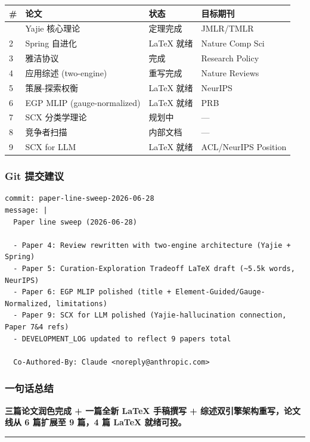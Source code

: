 \documentclass[
  12pt,
]{ctexart}
\begin{document}
\begin{longtable}[]{@{}llll@{}}
\toprule\noalign{}
\# & 论文 & 状态 & 目标期刊 \\
\midrule\noalign{}
\endhead
\bottomrule\noalign{}
\endlastfoot
1 & Yajie 核心理论 & 定理完成 & JMLR/TMLR \\
2 & Spring 自进化 & LaTeX 就绪 & Nature Comp Sci \\
3 & 雅洁协议 & 完成 & Research Policy \\
4 & 应用综述 (two-engine) & 重写完成 & Nature Reviews \\
5 & 策展-探索权衡 & LaTeX 就绪 & NeurIPS \\
6 & EGP MLIP (gauge-normalized) & LaTeX 就绪 & PRB \\
7 & SCX 分类学理论 & 规划中 & --- \\
8 & 竞争者扫描 & 内部文档 & --- \\
9 & SCX for LLM & LaTeX 就绪 & ACL/NeurIPS Position \\
\end{longtable}

\subsubsection{Git 提交建议}\label{git-ux63d0ux4ea4ux5efaux8bae}

\begin{verbatim}
commit: paper-line-sweep-2026-06-28
message: |
  Paper line sweep (2026-06-28)
  
  - Paper 4: Review rewritten with two-engine architecture (Yajie + Spring)
  - Paper 5: Curation-Exploration Tradeoff LaTeX draft (~5.5k words, NeurIPS)
  - Paper 6: EGP MLIP polished (title + Element-Guided/Gauge-Normalized, limitations)
  - Paper 9: SCX for LLM polished (Yajie-hallucination connection, Paper 7&4 refs)
  - DEVELOPMENT_LOG updated to reflect 9 papers total
  
  Co-Authored-By: Claude <noreply@anthropic.com>
\end{verbatim}

\subsubsection{一句话总结}\label{ux4e00ux53e5ux8bddux603bux7ed3-1}

\textbf{三篇论文润色完成 + 一篇全新 LaTeX 手稿撰写 +
综述双引擎架构重写，论文线从 6 篇扩展至 9 篇，4 篇 LaTeX 就绪可投。}

\begin{center}\rule{0.5\linewidth}{0.5pt}\end{center}
\end{document}
